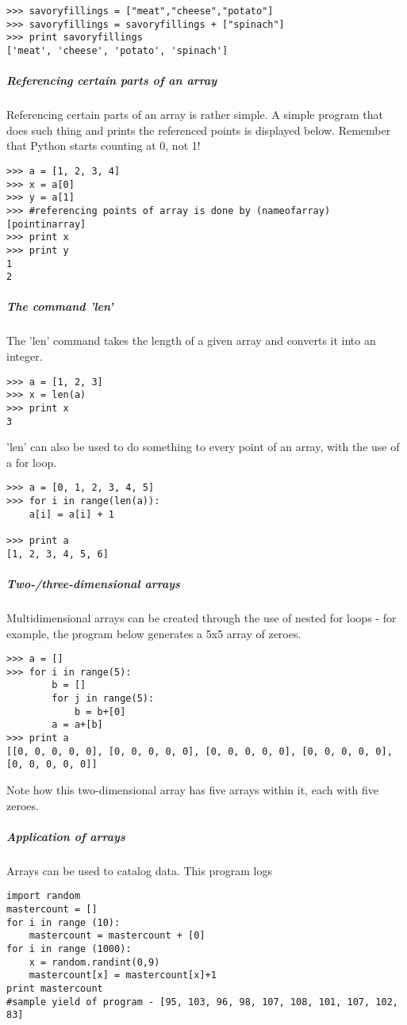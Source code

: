 \begin{lstlisting}
>>> savoryfillings = ["meat","cheese","potato"] 
>>> savoryfillings = savoryfillings + ["spinach"] 
>>> print savoryfillings 
['meat', 'cheese', 'potato', 'spinach']
\end{lstlisting}



\subparagraph{Referencing certain parts of an array}

Referencing certain parts of an array is rather simple. A simple program
that does such thing and prints the referenced points is displayed
below. Remember that Python starts counting at 0, not 1!

\begin{lstlisting}
>>> a = [1, 2, 3, 4]
>>> x = a[0]
>>> y = a[1]
>>> #referencing points of array is done by (nameofarray)[pointinarray]
>>> print x
>>> print y
1
2
\end{lstlisting}



\subparagraph{The command 'len'}

The 'len' command takes the length of a given array and converts it
into an integer. 

\begin{lstlisting}
>>> a = [1, 2, 3]
>>> x = len(a)
>>> print x
3
\end{lstlisting}


'len' can also be used to do something to every point of an array,
with the use of a for loop.

\begin{lstlisting}
>>> a = [0, 1, 2, 3, 4, 5]
>>> for i in range(len(a)): 	
	a[i] = a[i] + 1

>>> print a 
[1, 2, 3, 4, 5, 6]  
\end{lstlisting}



\subparagraph{Two-/three-dimensional arrays}

Multidimensional arrays can be created through the use of nested for
loops - for example, the program below generates a 5x5 array of zeroes.

\begin{lstlisting}
>>> a = [] 
>>> for i in range(5):     
		b = []     
		for j in range(5):         
			b = b+[0]     
		a = a+[b] 
>>> print a
[[0, 0, 0, 0, 0], [0, 0, 0, 0, 0], [0, 0, 0, 0, 0], [0, 0, 0, 0, 0], [0, 0, 0, 0, 0]]
\end{lstlisting}


Note how this two-dimensional array has five arrays within it, each
with five zeroes.


\subparagraph{Application of arrays}

Arrays can be used to catalog data. This program logs 

\begin{lstlisting}
import random
mastercount = []
for i in range (10):
	mastercount = mastercount + [0]
for i in range (1000):
	x = random.randint(0,9)
	mastercount[x] = mastercount[x]+1
print mastercount
#sample yield of program - [95, 103, 96, 98, 107, 108, 101, 107, 102, 83]
\end{lstlisting}

